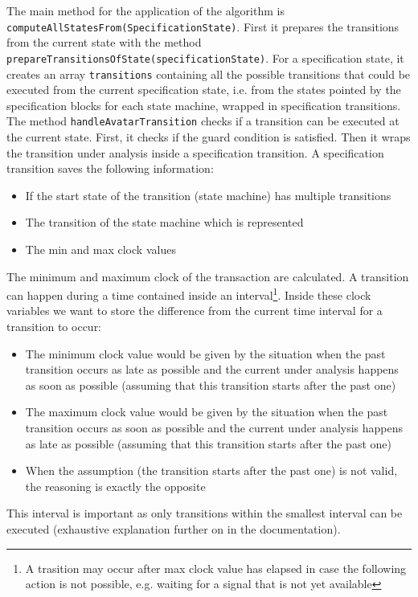 \documentclass[12pt]{article}
\begin{document}
The main method for the application of the algorithm is \texttt{computeAllStatesFrom(SpecificationState)}. 
First it prepares the transitions from the current state with the method \texttt{prepareTransitionsOfState(specificationState)}. For a specification state, it creates an array \texttt{transitions} containing all the possible transitions that could be executed from the current specification state, i.e. from the states pointed by the specification blocks for each state machine, wrapped in specification transitions. \\
The method \texttt{handleAvatarTransition} checks if a transition can be executed at the current state. First, it checks if the guard condition is satisfied. Then it wraps the transition under analysis inside a specification transition. A specification transition saves the following information:
\begin{itemize}
\item If the start state of the transition (state machine) has multiple transitions
\item The transition of the state machine which is represented
\item The  min and max clock values
\end{itemize}
The minimum and maximum clock of the transaction are calculated. A transition can happen during a time contained inside an interval\footnote{A trasition may occur after max clock value has elapsed in case the following action is not possible, e.g. waiting for a signal that is not yet available}. Inside these clock variables we want to store the difference from the current time interval for a transition to occur:
\begin{itemize}
\item The minimum clock value would be given by the situation when the past transition occurs as late as possible and the current under analysis happens as soon as possible (assuming that this transition starts after the past one)
\item The maximum clock value would be given by the situation when the past transition occurs as soon as possible and the current under analysis happens as late as possible (assuming that this transition starts after the past one)
\item When the assumption (the transition starts after the past one) is not valid, the reasoning is exactly the opposite
\end{itemize}
This interval is important as only transitions within the smallest interval can be executed (exhaustive explanation further on in the documentation).\\
\end{document}
